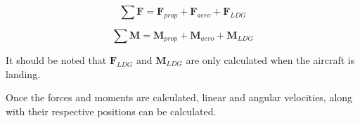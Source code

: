 \begin{equation}
    \sum \mathbf{F} = \mathbf{F}_{prop} + \mathbf{F}_{aero} + \mathbf{F}_{LDG}
    \label{eq:sumForce}
\end{equation}

\begin{equation}
    \sum \mathbf{M} = \mathbf{M}_{prop} + \mathbf{M}_{aero} + \mathbf{M}_{LDG}
    \label{eq:sumMoments}
\end{equation}

It should be noted that \(\mathbf{F}_{LDG}\) and \(\mathbf{M}_{LDG}\) are only calculated when the aircraft is landing.

Once the forces and moments are calculated, linear and angular velocities, along with their respective positions can be calculated.
\clearpage